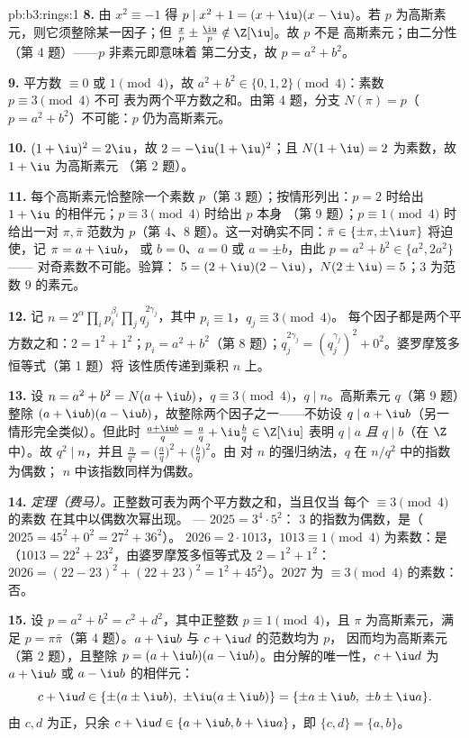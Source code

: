 \begin{solution}{pb:b3:rings:1}
\textbf{8.} 由 $x^2 \equiv -1$ 得 $p \mid x^2 + 1 = (x + \iu)(x -
\iu)$。若 $p$ 为高斯素元，则它须整除某一因子；但
$\frac xp \pm \frac \iu p \notin \Z[\iu]$。故 $p$ 不是
高斯素元；由二分性（第 4 题）——$p$ 非素元即意味着
第二分支，故 $p = a^2 + b^2$。

\textbf{9.} 平方数 $\equiv 0$ 或 $1 \pmod 4$，故 $a^2 + b^2
\in \{0, 1, 2\} \pmod 4$：素数 $p \equiv 3 \pmod 4$ 不可
表为两个平方数之和。由第 4 题，分支 $N(\pi) = p$（$p =
a^2+b^2$）不可能：$p$ 仍为高斯素元。

\textbf{10.} $(1 + \iu)^2 = 2\iu$，故 $2 = -\iu(1 + \iu)^2$；且
$N(1 + \iu) = 2$ 为素数，故 $1 + \iu$ 为高斯素元
（第 2 题）。

\textbf{11.} 每个高斯素元恰整除一个素数
$p$（第 3 题）；按情形列出：$p = 2$ 时给出
$1 + \iu$ 的相伴元；$p \equiv 3 \pmod 4$ 时给出 $p$ 本身
（第 9 题）；$p \equiv 1 \pmod 4$ 时给出一对 $\pi, \bar\pi$
范数为 $p$（第 4、8 题）。这一对确实不同：$\bar\pi \in
\{\pm\pi, \pm\iu\pi\}$ 将迫使，记 $\pi = a + \iu b$，
或 $b = 0$、$a = 0$ 或 $a = \pm b$，由此 $p = a^2 + b^2 \in
\{a^2, 2a^2\}$ —— 对奇素数不可能。验算：
$5 = (2 + \iu)(2 - \iu)$，$N(2\pm\iu) = 5$；$3$ 为范数
$9$ 的素元。

\textbf{12.} 记 $n = 2^{\alpha}\prod_i p_i^{\beta_i} \prod_j
q_j^{2\gamma_j}$，其中 $p_i \equiv 1$，$q_j \equiv 3 \pmod 4$。
每个因子都是两个平方数之和：$2 = 1^2 + 1^2$；$p_i = a^2
+ b^2$（第 8 题）；$q_j^{2\gamma_j} = (q_j^{\gamma_j})^2 +
0^2$。婆罗摩笈多恒等式（第 1 题）将
该性质传递到乘积 $n$ 上。

\textbf{13.} 设 $n = a^2 + b^2 = N(a + \iu b)$，$q \equiv 3
\pmod 4$，$q \mid n$。高斯素元 $q$（第 9 题）整除
$(a + \iu b)(a - \iu b)$，故整除两个因子之一——不妨设 $q
\mid a + \iu b$（另一情形完全类似）。但此时 $\frac{a +
\iu b}{q} = \frac aq + \iu \frac bq \in \Z[\iu]$ 表明 $q
\mid a$ \emph{且} $q \mid b$（在 $\Z$ 中）。故 $q^2 \mid n$，并且
$\frac n{q^2} =
\bigl(\frac aq\bigr)^2 + \bigl(\frac bq\bigr)^2$。由
对 $n$ 的强归纳法，$q$ 在 $n/q^2$ 中的指数为偶数；
$n$ 中该指数同样为偶数。

\textbf{14.} \emph{定理（费马）。}正整数可表为两个平方数之和，当且仅当
每个 $\equiv 3 \pmod 4$ 的素数
在其中以偶数次幂出现。 --- $2025 = 3^4 \cdot 5^2$：
$3$ 的指数为偶数，是（$2025 = 45^2 + 0^2 = 27^2 + 36^2$）。
$2026 = 2 \cdot 1013$，$1013 \equiv 1 \pmod 4$ 为素数：是
（$1013 = 22^2 + 23^2$，由婆罗摩笈多恒等式及 $2 = 1^2+1^2$：
$2026 = (22 - 23)^2 + (22 + 23)^2 = 1^2 + 45^2$）。$2027$ 为
$\equiv 3 \pmod 4$ 的素数：否。

\textbf{15.} 设 $p = a^2 + b^2 = c^2 + d^2$，其中正整数
$p \equiv 1 \pmod 4$，且 $\pi$ 为高斯素元，满足
$p = \pi\bar\pi$（第 4 题）。$a + \iu b$ 与 $c + \iu d$ 的范数均为 $p$，
因而均为高斯素元（第 2 题），且整除
$p = (a+\iu b)(a - \iu b)$。由分解的唯一性，$c +
\iu d$ 为 $a + \iu b$ 或 $a - \iu b$ 的相伴元：
\[
c + \iu d \in \{\pm(a \pm \iu b),\ \pm\iu(a \pm \iu b)\}
= \{\pm a \pm \iu b,\ \pm b \pm \iu a\}.
\]
由 $c, d$ 为正，只余 $c + \iu d \in \{a + \iu b, b + \iu
a\}$，即 $\{c, d\} = \{a, b\}$。


\end{solution}
